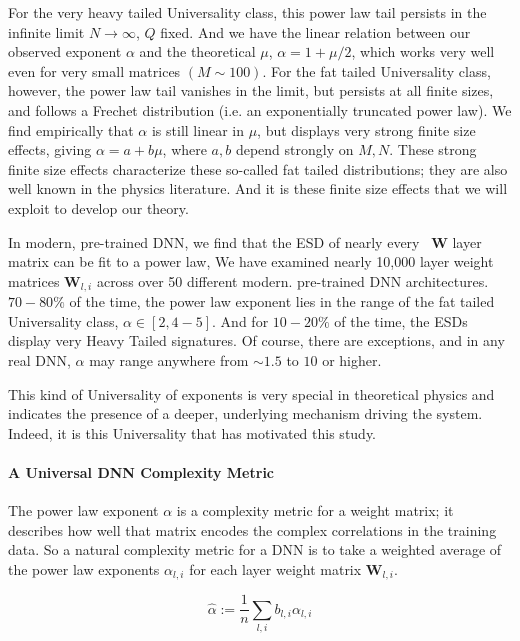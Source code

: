 For the very heavy tailed Universality class, this power law tail persists in the infinite limit $N\rightarrow\infty$, $Q$ fixed.
And we have the linear relation between our observed exponent $\alpha$ and the theoretical $\mu$,  $\alpha=1+\mu/2$,
which works very well even for very small matrices $(M\sim100)$.
For the fat tailed Universality class, however, the power law tail vanishes in the limit, but persists at all finite sizes, and
follows a Frechet distribution (i.e. an exponentially truncated power law).  We find empirically that $\alpha$ is still
linear in $\mu$, but displays very strong finite size effects, giving $\alpha=a+b\mu$, where $a,b$ depend strongly on $M,N$.
These strong finite size effects characterize these so-called fat tailed distributions; they are also well known in the physics
literature\cite{sornette}. And it is these finite size effects that we will exploit to develop our theory.

In modern, pre-trained DNN, we find that the ESD of nearly every \ $\mathbf{W}$ layer matrix can be fit to a power law,
We have examined nearly 10,000 layer weight matrices $\mathbf{W}_{l,i}$ across over 50 different modern. pre-trained DNN architectures.  
 $70-80\%$ of the time, the power law exponent lies in the range of the fat tailed Universality class, $\alpha\in[2,4-5]$.
And for $10-20\%$ of the time, the ESDs display very Heavy Tailed signatures.
Of course, there are exceptions, and in any real DNN,  $\alpha$ may range anywhere from $\sim1.5$ to $10$ or higher.  

This kind of Universality of exponents is very special in theoretical physics and indicates the presence of a deeper, 
underlying mechanism driving the system.  Indeed, it is this Universality that has motivated this study.

\paragraph{A Universal DNN Complexity Metric}

The power law exponent $\alpha$ is a complexity metric for a weight matrix; it describes how well that matrix encodes the complex correlations in the training data.
So a natural complexity metric for a DNN is to take a weighted average of the power law exponents $\alpha_{l,i}$ for each layer weight matrix $\mathbf{W}_{l,i}$.

$$\hat{\alpha}:=\dfrac{1}{n}\sum_{l,i}b_{l,i}\alpha_{l,i}$$

